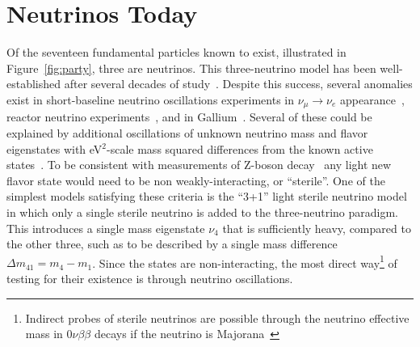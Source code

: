 \documentclass[main.tex]{subfiles}
\begin{document}
\section{Neutrinos Today}

Of the seventeen fundamental particles known to exist, illustrated in Figure~\ref{fig:party}, three are neutrinos. 
This three-neutrino model has been well-established after several decades of study~\cite{PhysRevD.98.030001,Esteban_2019,de_Salas_2018,Capozzi_2016,zboson2006, berns2021recent}.
Despite this success, several anomalies exist in short-baseline neutrino oscillations experiments in $\nu_{\mu}\to\nu_{e}$ appearance~\cite{aguilar2018significant}, reactor neutrino experiments~\cite{mention2011reactor,serebrov2019first}, and in Gallium~\cite{PhysRevC.73.045805,giunti2011statistical}. 
Several of these could be explained by additional oscillations of unknown neutrino mass and flavor eigenstates with eV$^{2}$-scale mass squared differences from the known active states~\cite{abazajian2012light}. 
To be consistent with measurements of Z-boson decay~\cite{zboson2006} any light new flavor state would need to be non weakly-interacting, or ``sterile''. 
One of the simplest models satisfying these criteria is the ``3+1'' light sterile neutrino model in which only a single sterile neutrino is added to the three-neutrino paradigm. 
This introduces a single mass eigenstate $\nu_{4}$ that is sufficiently heavy, compared to the other three, such as to be described by a single mass difference $\Delta m_{41}=m_{4}-m_{1}$. 
Since the states are non-interacting, the most direct way\footnote{Indirect probes of sterile neutrinos are possible through the neutrino effective mass in $0\nu\beta\beta$ decays if the neutrino is Majorana~\cite{HUANG2019114691}} of testing for their existence is through neutrino oscillations. 
\end{document}
